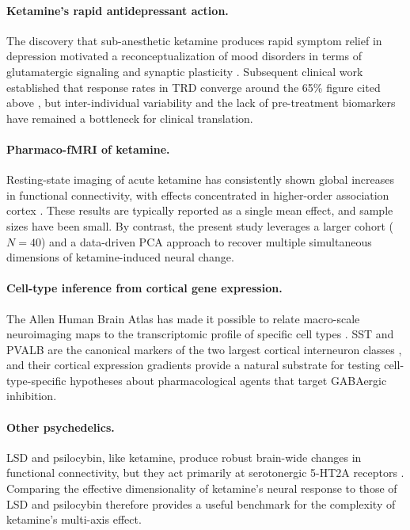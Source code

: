 \paragraph{Ketamine's rapid antidepressant action.} The discovery that
sub-anesthetic ketamine produces rapid symptom relief in depression
\citep{berman2000ketamine,zarate2006randomized} motivated a reconceptualization
of mood disorders in terms of glutamatergic signaling and synaptic plasticity
\citep{duman2016synaptic}. Subsequent clinical work established that response
rates in TRD converge around the 65\% figure cited above
\citep{murrough2013antidepressant,krystal2019ketamine}, but inter-individual
variability and the lack of pre-treatment biomarkers have remained a bottleneck
for clinical translation.

\paragraph{Pharmaco-fMRI of ketamine.} Resting-state imaging of acute ketamine
has consistently shown global increases in functional connectivity, with
effects concentrated in higher-order association cortex
\citep{driesen2013relationship,anticevic2014ncs,abdallah2018ketamine}. These
results are typically reported as a single mean effect, and sample sizes
have been small. By contrast, the present study leverages a larger cohort
($N=40$) and a data-driven PCA approach to recover multiple simultaneous
dimensions of ketamine-induced neural change.

\paragraph{Cell-type inference from cortical gene expression.} The Allen Human
Brain Atlas has made it possible to relate macro-scale neuroimaging maps to
the transcriptomic profile of specific cell types
\citep{hawrylycz2012anatomically,burt2018hierarchy}. SST and PVALB are the
canonical markers of the two largest cortical interneuron classes
\citep{rudy2011three,tremblay2016gabaergic}, and their cortical expression
gradients provide a natural substrate for testing cell-type-specific
hypotheses about pharmacological agents that target GABAergic inhibition.

\paragraph{Other psychedelics.} LSD and psilocybin, like ketamine, produce
robust brain-wide changes in functional connectivity, but they act primarily
at serotonergic 5-HT2A receptors
\citep{carhart2016neural,preller2020psilocybin,preller2018effective}. Comparing
the effective dimensionality of ketamine's neural response to those of LSD
and psilocybin therefore provides a useful benchmark for the complexity of
ketamine's multi-axis effect.

